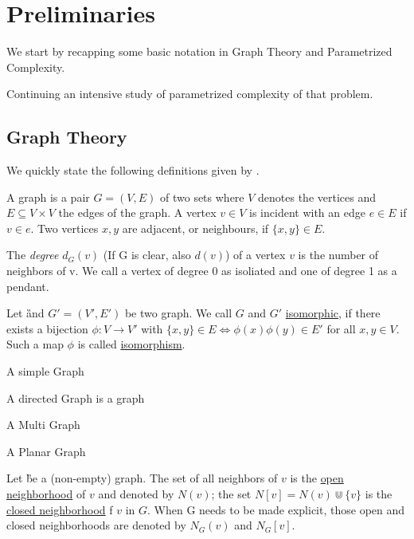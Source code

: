 \chapter{Preliminaries}
We start by recapping some basic notation in Graph Theory and Parametrized Complexity. 

Continuing an intensive study of parametrized complexity of that problem. 

\section{Graph Theory}
We quickly state the following definitions given by {\cite[p.~xxx]{diestel10}}.

\begin{definition}
    A graph is a pair $G = (V, E)$ of two sets where $V$ denotes the vertices and $E \subseteq V \times V$ the edges of the graph.  A vertex $v \in V$ is incident with an edge $e \in E$ if $v \in e$. Two vertices $x, y$ are adjacent, or neighbours, if $\{x,y \} \in E$.
\end{definition}

\begin{definition}
    The \textit{degree} $d_G(v)$ (If G is clear, also $d(v)$) of a vertex $v$ is the number of neighbors of v. We call a vertex of degree 0 as isoliated and one of degree 1 as a pendant.
\end{definition}

\begin{definition}
Let \G and $G' = (V', E')$ be two graph. We call $G$ and $G'$ \underline{isomorphic}, if there exists a bijection $\phi: V \rightarrow V'$ with $\{x, y\} \in E \Leftrightarrow \phi(x)\phi(y) \in E'$ for all  $x,y \in V$. Such a map $\phi$ is called \underline{isomorphism}.
\end{definition}

\begin{definition}
    A simple Graph
    
    A directed Graph is a graph
    
    A Multi Graph
    
    A Planar Graph
\end{definition}

\begin{definition}
    Let \G be a (non-empty) graph. 
    The set of all neighbors of $v$ is the \underline{open neighborhood} of $v$ and denoted by $N(v)$; the set $N[v] = N(v) \Cup \{v\}$ is the \underline{closed neighborhood} f $v$ in $G$. When G needs to be made explicit, those open and closed neighborhoods are denoted by $N_G(v)$ and $N_G[v]$. 
\end{definition}

